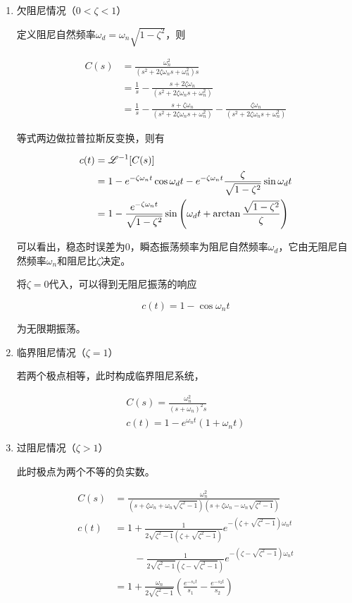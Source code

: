 \begin{enumerate}
	\item	欠阻尼情况（$0<\zeta<1$）

	定义阻尼自然频率$\omega_d=\omega_n\sqrt{1-\zeta^2}$，则

	\begin{align*}
	C(s)&=\frac{\omega_n^2}{(s^2+2\zeta\omega_ns+\omega_n^2)s}\\
	&=\frac1s-\frac{s+2\zeta\omega_n}{(s^2+2\zeta\omega_ns+\omega_n^2)}\\
	&=\frac1s-\frac{s+\zeta\omega_n}{(s^2+2\zeta\omega_ns+\omega_n^2)}-\frac{\zeta\omega_n}{(s^2+2\zeta\omega_ns+\omega_n^2)}
	\end{align*}

	等式两边做拉普拉斯反变换，则有

	\begin{align*}
	c(t)&=\mathscr{L}^{-1}[C(s)]\\
	&=1-e^{-\zeta\omega_nt}\cos\omega_dt-e^{-\zeta\omega_nt}\frac{\zeta}{\sqrt{1-\zeta^2}}\sin\omega_dt\\
	&=1-\frac{e^{-\zeta\omega_nt}}{\sqrt{1-\zeta^2}}\sin\left(\omega_dt+\arctan\frac{\sqrt{1-\zeta^2}}{\zeta}\right)
	\end{align*}

	可以看出，稳态时误差为$0$，瞬态振荡频率为阻尼自然频率$\omega_d$，它由无阻尼自然频率$\omega_n$和阻尼比$\zeta$决定。

	将$\zeta=0$代入，可以得到无阻尼振荡的响应

	\begin{equation*}
	c(t)=1-\cos\omega_nt
	\end{equation*}
	
	为无限期振荡。

	\item	临界阻尼情况（$\zeta=1$）

	若两个极点相等，此时构成临界阻尼系统，

	\begin{gather*}
	C(s)=\frac{\omega_n^2}{(s+\omega_n)^2s}\\
	c(t)=1-e^{\omega_nt}(1+\omega_nt)
	\end{gather*}

	\item	过阻尼情况（$\zeta>1$）

	此时极点为两个不等的负实数。

	\begin{align*}
	C(s)&=\frac{\omega_n^2}{\left(s+\zeta\omega_n+\omega_n\sqrt{\zeta^2-1}\right)\left(s+\zeta\omega_n-\omega_n\sqrt{\zeta^2-1}\right)}\\
	c(t)&=1+\frac{1}{2\sqrt{\zeta^2-1}\left(\zeta+\sqrt{\zeta^2-1}\right)}e^{-\left(\zeta+\sqrt{\zeta^2-1}\right)\omega_nt}\\
	&\hspace{2em}-\frac{1}{2\sqrt{\zeta^2-1}\left(\zeta-\sqrt{\zeta^2-1}\right)}e^{-\left(\zeta-\sqrt{\zeta^2-1}\right)\omega_nt}\\
	&=1+\frac{\omega_n}{2\sqrt{\zeta^2-1}}\left(\frac{e^{-s_1t}}{s_1}-\frac{e^{-s_2t}}{s_2}\right)
	\end{align*}


\end{enumerate}
